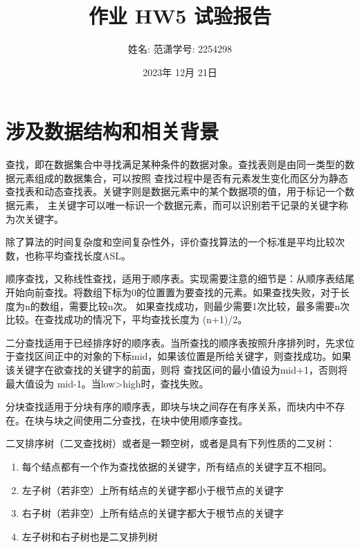 \documentclass[a4paper,11pt]{article}%
\author{姓名: 范潇\phantom{11}学号: 2254298}
\title{作业 HW5 试验报告}
\date{2023年 12月 21日}
\begin{document}
\lstset{breaklines}%
		\lstset{extendedchars=false}%
\pagestyle{plain}%
\maketitle
\section{涉及数据结构和相关背景}
查找，即在数据集合中寻找满足某种条件的数据对象。查找表则是由同一类型的数据元素组成的数据集合，可以按照
查找过程中是否有元素发生变化而区分为静态查找表和动态查找表。关键字则是数据元素中的某个数据项的值，用于标记一个数据元素，
主关键字可以唯一标识一个数据元素，而可以识别若干记录的关键字称为次关键字。

除了算法的时间复杂度和空间复杂性外，评价查找算法的一个标准是平均比较次数，也称平均查找长度ASL。

顺序查找，又称线性查找，适用于顺序表。实现需要注意的细节是：从顺序表结尾开始向前查找。将数组下标为0的位置置为要查找的元素。如果查找失败，对于长度为n的数组，需要比较n次。
如果查找成功，则最少需要1次比较，最多需要n次比较。在查找成功的情况下，平均查找长度为 (n+1)/2。

二分查找适用于已经排序好的顺序表。当所查找的顺序表按照升序排列时，先求位于查找区间正中的对象的下标mid，如果该位置是所给关键字，则查找成功。如果该关键字在欲查找的关键字的前面，则将 
查找区间的最小值设为mid+1，否则将最大值设为 mid-1。当low>high时，查找失败。

分块查找适用于分块有序的顺序表，即块与块之间存在有序关系，而块内中不存在。在块与块之间使用二分查找，在块中使用顺序查找。

二叉排序树（二叉查找树）或者是一颗空树，或者是具有下列性质的二叉树：
\begin{enumerate}
\item 每个结点都有一个作为查找依据的关键字，所有结点的关键字互不相同。
\item 左子树（若非空）上所有结点的关键字都小于根节点的关键字
\item  右子树（若非空）上所有结点的关键字都大于根节点的关键字
\item  左子树和右子树也是二叉排列树
\end{enumerate}
\end{document}
